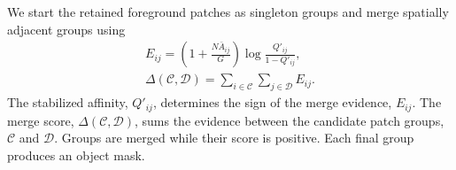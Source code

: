 We start the retained foreground patches as singleton groups and merge spatially adjacent groups
using
\begin{equation}
\begin{gathered}
E_{ij}=\left(1+\frac{N\bar A_{ij}}{G}\right)\log\frac{Q'_{ij}}{1-Q'_{ij}},\\
\Delta(\mathcal C,\mathcal D)=\sum_{i\in\mathcal C}\sum_{j\in\mathcal D}E_{ij}.
\end{gathered}
\end{equation}
The stabilized affinity, $Q'_{ij}$, determines the sign of the merge evidence, $E_{ij}$. The merge
score, $\Delta(\mathcal C,\mathcal D)$, sums the evidence between the candidate patch groups,
$\mathcal C$ and $\mathcal D$. Groups are merged while their score is positive. Each final group
produces an object mask.
